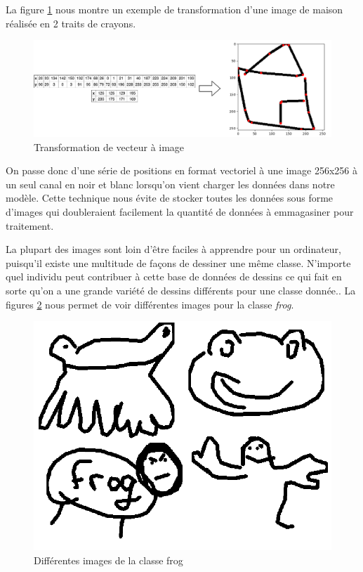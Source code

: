 

La figure \ref{transformationimage} nous montre un exemple de transformation d'une image de maison réalisée en 2 traits de crayons. 

\begin{figure}[h]
	\includegraphics[width=\linewidth]{images/Transformations_horizontal.pdf} %
	\caption{Transformation de vecteur à image} %
	\label{transformationimage} 
\end{figure}

On passe donc d'une série de positions en format vectoriel à une image 256x256 à un seul canal en noir et blanc lorsqu'on vient charger les données dans notre modèle. 
Cette technique nous évite de stocker toutes les données sous forme d'images qui doubleraient facilement la quantité de données à emmagasiner pour traitement. 


La plupart des images sont loin d'être faciles à apprendre pour un ordinateur, puisqu'il existe une multitude de façons de dessiner une même classe.
N'importe quel individu peut contribuer à cette base de données de dessins ce qui fait en sorte qu'on a une grande variété de dessins différents pour une classe donnée.. La figures \ref{frogs} nous permet de voir différentes images pour la classe \emph{frog}.


\begin{figure}[h]
	\includegraphics[width=\linewidth]{images/Combo_frogs.png} %
	\caption{Différentes images de la classe frog} %
	\label{frogs} 
\end{figure}


